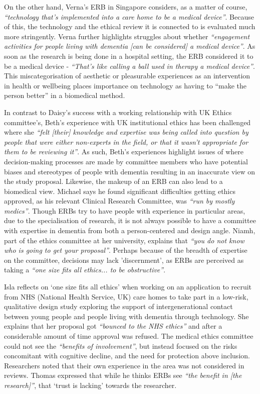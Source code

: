On the other hand, Verna’s ERB in Singapore considers, as a matter of course, \textit{“technology that’s implemented into a care home to be a medical device”}. Because of this, the technology and the ethical review it is connected to is evaluated much more stringently. Verna further highlights struggles about whether \textit{“engagement activities for people living with dementia [can be considered] a medical device”}. As soon as the research is being done in a hospital setting, the ERB considered it to be a medical device - \textit{“That’s like calling a ball used in therapy a medical device”}. This miscategorisation of aesthetic or pleasurable experiences as an intervention in health or wellbeing places importance on technology as having to “make the person better” in a biomedical method.

In contrast to Daisy’s success with a working relationship with UK Ethics committee’s, Beth’s experience with UK institutional ethics has been challenged where she \textit{“felt [their] knowledge and expertise was being called into question by people that were either non-experts in the field, or that it wasn’t appropriate for them to be reviewing it”}. As such, Beth’s experiences highlight issues of where decision-making processes are made by committee members who have potential biases and stereotypes of people with dementia resulting in an inaccurate view on the study proposal. Likewise, the makeup of an ERB can also lead to a biomedical view. Michael says he found significant difficulties getting ethics approved, as his relevant Clinical Research Committee, was \textit{“run by mostly medics”}. Though ERBs try to have people with experience in particular areas, due to the specialisation of research, it is not always possible to have a committee with expertise in dementia from both a person-centered and design angle. Niamh, part of the ethics committee at her university, explains that \textit{“you do not know who is going to get your proposal”}. Perhaps because of the breadth of expertise on the committee, decisions may lack 'discernment', as ERBs are perceived as taking a \textit{“one size fits all ethics... to be obstructive”}. 

Isla reflects on ‘one size fits all ethics’ when working on an application to recruit from NHS (National Health Service, UK) care homes to take part in a low-risk, qualitative design study exploring the support of intergenerational contact between young people and people living with dementia through technology. She explains that her proposal got \textit{“bounced to the NHS ethics”} and after a considerable amount of time approval was refused. The medical ethics committee could not see the \textit{“benefits of involvement”}, but instead focused on the risks concomitant with cognitive decline, and the need for protection above inclusion. 
Researchers noted that their own experience in the area was not considered in reviews. Thomas expressed that while he thinks ERBs see \textit{“the benefit in [the research]”}, that ‘trust is lacking’ towards the researcher. 


